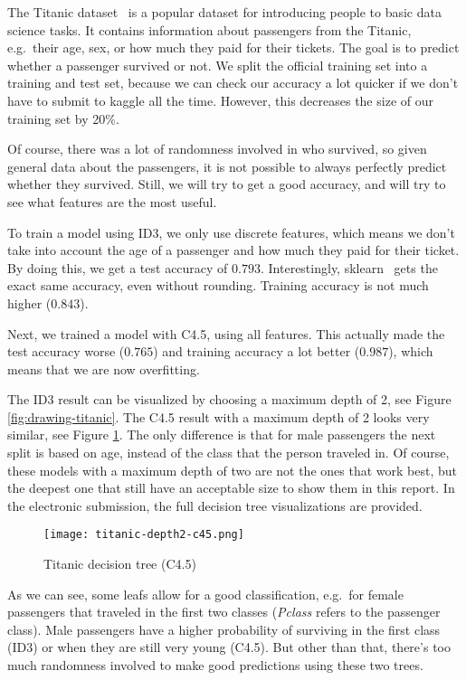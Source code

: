 \documentclass[a4paper]{article}
\begin{document}
The Titanic dataset~\cite{titanic} is a popular dataset for introducing people to basic data science tasks. It contains information about passengers from the Titanic, e.g.\  their age, sex, or how much they paid for their tickets. The goal is to predict whether a passenger survived or not. We split the official training set into a training and test set, because we can check our accuracy a lot quicker if we don't have to submit to kaggle all the time. However, this decreases the size of our training set by 20\%.

Of course, there was a lot of randomness involved in who survived, so given general data about the passengers, it is not possible to always perfectly predict whether they survived. Still, we will try to get a good accuracy, and will try to see what features are the most useful.

To train a model using ID3, we only use discrete features, which means we don't take into account the age of a passenger and how much they paid for their ticket. By doing this, we get a test accuracy of $0.793$. Interestingly, sklearn~\cite{scikit-learn} gets the exact same accuracy, even without rounding. Training accuracy is not much higher ($0.843$).

Next, we trained a model with C4.5, using all features. This actually made the test accuracy worse ($0.765$) and training accuracy a lot better ($0.987$), which means that we are now overfitting.

The ID3 result can be visualized by choosing a maximum depth of 2, see Figure \ref{fig:drawing-titanic}. The C4.5 result with a maximum depth of 2 looks very similar, see Figure \ref{fig:titanic}. The only difference is that for male passengers the next split is based on age, instead of the class that the person traveled in. Of course, these models with a maximum depth of two are not the ones that work best, but the deepest one that still have an acceptable size to show them in this report. In the electronic submission, the full decision tree visualizations are provided.

\begin{figure}[h]
	\texttt{[image: titanic-depth2-c45.png]}
    \caption{Titanic decision tree (C4.5)}
    \label{fig:titanic}
\end{figure}

As we can see, some leafs allow for a good classification, e.g.\ for female passengers that traveled in the first two classes (\emph{Pclass} refers to the passenger class). Male passengers have a higher probability of surviving in the first class (ID3) or when they are still very young (C4.5). But other than that, there's too much randomness involved to make good predictions using these two trees.
\end{document}
